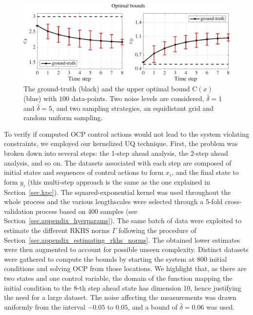 \begin{figure}[t]
	\includegraphics[scale=0.4]{../images/chap2_numex_ex3_time_opt.pdf}
	\caption{The ground-truth (black) and the upper optimal bound C$(x)$ (blue) with $100$ data-points. Two noise levels are considered, $\bar\delta = 1$ and $\bar\delta = 5$, and two sampling strategies, an equidistant grid and random uniform sampling.}
	\label{fig:ex3_time}
\end{figure}

To verify if computed OCP control actions would not lead to the system violating constraints, we employed our kernelized UQ technique. First, the problem was broken down into several steps: the 1-step ahead analysis, the 2-step ahead analysis, and so on. The datasets associated with each step are composed of initial states and sequences of control actions to form $x_i$, and the final state to form $y_i$ (this multi-step approach is the same as the one explained in Section~\ref{sec.kpc}). The squared-exponential kernel was used throughout the whole process and the various lengthscales were selected through a 5-fold cross-validation process based on 400 samples (see Section~\ref{sec.appendix_hyerparams}). The same batch of data were exploited to estimate the different RKHS norms $\Gamma$ following the procedure of Section~\ref{sec.appendix_estimating_rkhs_norms}. The obtained lower estimates were then augmented to account for possible unseen complexity. Distinct datasets were gathered to compute the bounds by starting the system at $800$ initial conditions and solving OCP from those locations. We highlight that, as there are two states and one control variable, the domain of the function mapping the initial condition to the 8-th step ahead state has dimension 10, hence justifying the need for a large dataset. The noise affecting the measurements was drawn uniformly from the interval $-0.05$ to $0.05$, and a bound of $\bar \delta = 0.06$ was used.

